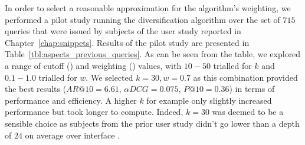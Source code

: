 In order to select a reasonable approximation for the algorithm's weighting, we performed a pilot study running the diversification algorithm over the set of $715$ queries that were issued by subjects of the user study reported in Chapter~\ref{chap:snippets}. Results of the pilot study are presented in Table~\ref{tbl:aspects_previous_queries}. As can be seen from the table, we explored a range of cutoff () and weighting () values, with $10-50$ trialled for $k$ and $0.1-1.0$ trialled for $w$. We selected $k=30, w=0.7$ as this combination provided the best results ($AR@10=6.61$, $\alpha DCG=0.075$, $P@10=0.36$) in terms of performance and efficiency. A higher $k$ for example only slightly increased performance but took longer to compute. Indeed, $k=30$ was deemed to be a sensible choice as subjects from the prior user study didn't go lower than a depth of $24$ on average over interface .


